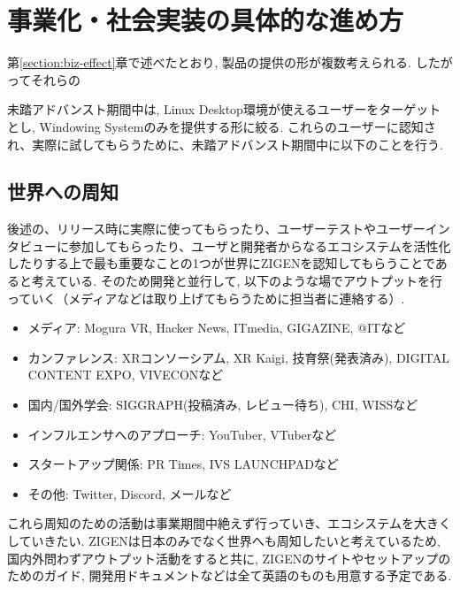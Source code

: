 \section{事業化・社会実装の具体的な進め方}


第\ref{section:biz-effect}章で述べたとおり, 製品の提供の形が複数考えられる.
したがってそれらの

未踏アドバンスト期間中は, Linux Desktop環境が使えるユーザーをターゲットとし, Windowing Systemのみを提供する形に絞る.
これらのユーザーに認知され、実際に試してもらうために、未踏アドバンスト期間中に以下のことを行う.

\subsection{世界への周知}
後述の、リリース時に実際に使ってもらったり、ユーザーテストやユーザーインタビューに参加してもらったり、ユーザと開発者からなるエコシステムを活性化したりする上で最も重要なことの1つが世界にZIGENを認知してもらうことであると考えている.
そのため開発と並行して, 以下のような場でアウトプットを行っていく（メディアなどは取り上げてもらうために担当者に連絡する）.
\begin{itemize}
  \item メディア: Mogura VR, Hacker News, ITmedia, GIGAZINE, @ITなど
  \item カンファレンス: XRコンソーシアム, XR Kaigi, 技育祭(発表済み), DIGITAL CONTENT EXPO, VIVECONなど
  \item 国内/国外学会: SIGGRAPH(投稿済み, レビュー待ち), CHI, WISSなど
  \item インフルエンサへのアプローチ: YouTuber, VTuberなど
  \item スタートアップ関係: PR Times, IVS LAUNCHPADなど
  \item その他: Twitter, Discord, メールなど
\end{itemize}

これら周知のための活動は事業期間中絶えず行っていき、エコシステムを大きくしていきたい.
ZIGENは日本のみでなく世界へも周知したいと考えているため, 国内外問わずアウトプット活動をすると共に, ZIGENのサイトやセットアップのためのガイド, 開発用ドキュメントなどは全て英語のものも用意する予定である.

